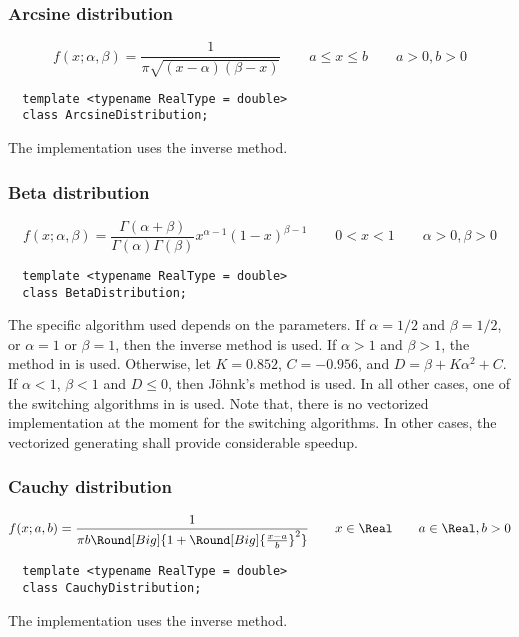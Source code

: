 \subsubsection{Arcsine distribution}

\begin{equation*}
  f(x;\alpha,\beta) = \frac{1}{\pi\sqrt{(x - \alpha)(\beta - x)}}
  \qquad a \le x \le b
  \qquad a > 0, b > 0
\end{equation*}
\begin{Verbatim}
  template <typename RealType = double>
  class ArcsineDistribution;
\end{Verbatim}
The implementation uses the inverse method.

\subsubsection{Beta distribution}

\begin{equation*}
  f(x;\alpha,\beta) =
  \frac{\Gamma(\alpha + \beta)}{\Gamma(\alpha)\Gamma(\beta)}
  x^{\alpha - 1}(1 - x)^{\beta - 1}
  \qquad 0 < x < 1
  \qquad \alpha > 0, \beta > 0
\end{equation*}
\begin{Verbatim}
  template <typename RealType = double>
  class BetaDistribution;
\end{Verbatim}
The specific algorithm used depends on the parameters. If $\alpha = 1/2$ and
$\beta = 1/2$, or $\alpha = 1$ or $\beta = 1$, then the inverse method is used.
If $\alpha > 1$ and $\beta > 1$, the method in \textcite{Cheng:1978jl} is used.
Otherwise, let $K = 0.852$, $C = -0.956$, and $D = \beta + K\alpha^2 + C$. If
$\alpha < 1$, $\beta < 1$ and $D \le 0$, then Jöhnk's method
\parencite[sec.~3.5]{Devroye:1986gi} is used. In all other cases, one of the
switching algorithms in \textcite{Atkinson:1979es} is used. Note that, there is
no vectorized implementation at the moment for the switching algorithms. In
other cases, the vectorized generating shall provide considerable speedup.

\subsubsection{Cauchy distribution}

\begin{equation*}
  f(x;a,b) = \frac{1}{\pi b\Round[Big]{
      1 + \Round[Big]{\frac{x - a}{b}}^2}}
  \qquad x \in \Real
  \qquad a \in \Real, b > 0
\end{equation*}
\begin{Verbatim}
  template <typename RealType = double>
  class CauchyDistribution;
\end{Verbatim}
The implementation uses the inverse method.

